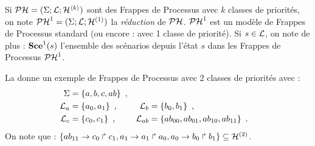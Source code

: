 \begin{definition}
  Si $\PH = (\PHs; \PHl; \PHh^{\langle k \rangle})$ sont des Frappes de Processus avec $k$
  classes de priorités, on note $\reduction[\PH] = (\PHs; \PHl; \PHh^{(1)})$
  la \emph{réduction} de $\PH$.
  $\reduction$ est un modèle de Frappes de Processus standard
  (ou encore : avec 1 classe de priorité).
  Si $s \in \PHl$, on note de plus : $\reduction[\Sce](s)$ l'ensemble des scénarios
  depuis l'état $s$ dans les Frappes de Processus $\reduction$.
\end{definition}


\begin{example}
  La  donne un exemple de Frappes de Processus avec 2 classes de priorités avec :
  \begin{align*}
    \PHs &= \{ a, b, c, ab \} \enspace, \\
    \PHl_a &= \{ a_0, a_1 \} \enspace, & \PHl_b &= \{ b_0, b_1 \} \enspace, \\
    \PHl_c &= \{ c_0, c_1 \} \enspace, & \PHl_{ab} &= \{ ab_{00}, ab_{01}, ab_{10}, ab_{11} \}
    \enspace.
  \end{align*}
  On note que :
  $\{ \PHhit{ab_{11}}{c_0}{c_1}, \PHhit{a_1}{a_1}{a_0}, \PHhit{a_0}{b_0}{b_1} \} \subseteq \PHh^{(2)}$.

\begin{figure}[tb]
  \centering
\end{figure}
\end{example}
